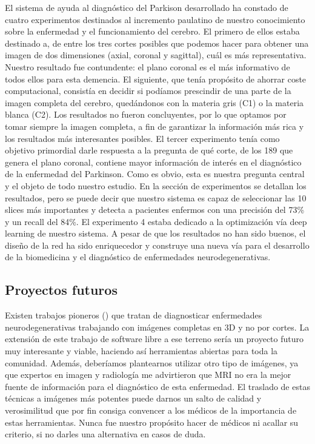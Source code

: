 El sistema de ayuda al diagnóstico del Parkison desarrollado ha constado de cuatro experimentos destinados al incremento paulatino de nuestro conocimiento sobre la enfermedad y el funcionamiento del cerebro. El primero de ellos estaba destinado a, de entre los tres cortes posibles que podemos hacer para obtener una imagen de dos dimensiones (axial, coronal y sagittal), cuál es más representativa. Nuestro resultado fue contundente: el plano coronal es el más informativo de todos ellos para esta demencia. El siguiente, que tenía propósito de ahorrar coste computacional, consistía en decidir si podíamos prescindir de una parte de la imagen completa del cerebro, quedándonos con la materia gris (C1) o la materia blanca (C2). Los resultados no fueron concluyentes, por lo que optamos por tomar siempre la imagen completa, a fin de garantizar la información más rica y los resultados más interesantes posibles. El tercer experimento tenía como objetivo primordial darle respuesta a la pregunta de qué corte, de los 189 que genera el plano coronal, contiene mayor información de interés en el diagnóstico de la enfermedad del Parkinson. Como es obvio, esta es nuestra pregunta central y el objeto de todo nuestro estudio. En la sección de experimentos se detallan los resultados, pero se puede decir que nuestro sistema es capaz de seleccionar las 10 slices más importantes y detecta a pacientes enfermos con una precisión del 73\% y un recall del 84\%. El experimento 4 estaba dedicado a la optimización vía deep learning de nuestro sistema. A pesar de que los resultados no han sido buenos, el diseño de la red ha sido enriquecedor y construye una nueva vía para el desarrollo de la biomedicina y el diagnóstico de enfermedades neurodegenerativas. 

\subsection{Proyectos futuros}

Existen trabajos pioneros (\cite{irojas}) que tratan de diagnosticar enfermedades neurodegenerativas trabajando con imágenes completas en 3D y no por cortes. La extensión de este trabajo de software libre a ese terreno sería un proyecto futuro muy interesante y viable, haciendo así herramientas abiertas para toda la comunidad. Además, deberíamos plantearnos utilizar otro tipo de imágenes, ya que expertos en imagen y radiología me advirtieron que MRI no era la mejor fuente de información para el diagnóstico de esta enfermedad. El traslado de estas técnicas a imágenes más potentes puede darnos un salto de calidad y verosimilitud que por fin consiga convencer a los médicos de la importancia de estas herramientas. Nunca fue nuestro propósito hacer de médicos ni acallar su criterio, si no darles una alternativa en casos de duda. \\

